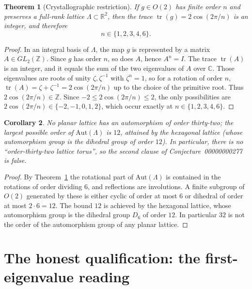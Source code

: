 \documentclass[11pt]{article}
\newtheorem{theorem}{Theorem}
\newtheorem{corollary}[theorem]{Corollary}
\theoremstyle{definition}
\theoremstyle{remark}
\newcommand{\R}{\mathbb{R}}
\newcommand{\Z}{\mathbb{Z}}
\newcommand{\C}{\mathbb{C}}
\newcommand{\Lam}{\Lambda}
\begin{document}
\begin{theorem}[Crystallographic restriction]
\label{thm:cryst}
If $g\in O(2)$ has finite order $n$ and preserves a full-rank lattice
$\Lam\subset\R^2$, then the trace $\operatorname{tr}(g)=2\cos(2\pi/n)$ is an
integer, and therefore
\begin{equation}
n\in\{1,2,3,4,6\}.
\end{equation}
\end{theorem}

\begin{proof}
In an integral basis of $\Lam$, the map $g$ is represented by a matrix
$A\in GL_2(\Z)$.  Since $g$ has order $n$, so does $A$, hence $A^n=I$.  The
trace $\operatorname{tr}(A)$ is an integer, and it equals the sum of the two
eigenvalues of $A$ over $\C$.  Those eigenvalues are roots of unity
$\zeta,\zeta^{-1}$ with $\zeta^n=1$, so for a rotation of order $n$,
$\operatorname{tr}(A)=\zeta+\zeta^{-1}=2\cos(2\pi/n)$ up to the choice of the
primitive root.  Thus $2\cos(2\pi/n)\in\Z$.  Since $-2\le 2\cos(2\pi/n)\le 2$,
the only possibilities are $2\cos(2\pi/n)\in\{-2,-1,0,1,2\}$, which occur
exactly at $n\in\{1,2,3,4,6\}$.
\end{proof}

\begin{corollary}
\label{cor:no32}
No planar lattice has an automorphism of order thirty-two; the largest
possible order of $\mathrm{Aut}(\Lam)$ is $12$, attained by the hexagonal
lattice (whose automorphism group is the dihedral group of order $12$).  In
particular, there is no ``order-thirty-two lattice torus'', so the second
clause of Conjecture~00000000277 is false.
\end{corollary}

\begin{proof}
By Theorem~\ref{thm:cryst} the rotational part of $\mathrm{Aut}(\Lam)$ is
contained in the rotations of order dividing $6$, and reflections are
involutions.  A finite subgroup of $O(2)$ generated by these is either cyclic
of order at most $6$ or dihedral of order at most $2\cdot 6=12$.  The bound
$12$ is achieved by the hexagonal lattice, whose automorphism group is the
dihedral group $D_6$ of order $12$.  In particular $32$ is not the order of
the automorphism group of any planar lattice.
\end{proof}

\section{The honest qualification: the first-eigenvalue reading}
\label{sec:honest}
\end{document}
